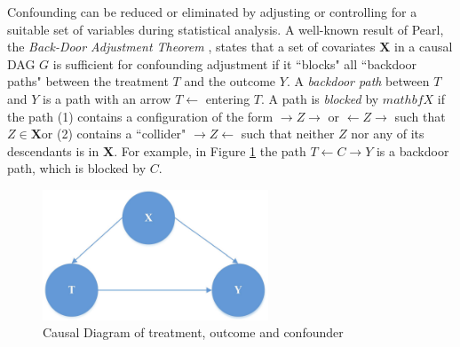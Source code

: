 Confounding can be reduced or eliminated by adjusting or controlling for a suitable set of variables during statistical analysis.  A well-known result of Pearl, the {\it Back-Door Adjustment Theorem} \cite{pearl2000models}, states that a set of covariates $\mathbf{X}$ in a causal DAG $G$ is sufficient for confounding adjustment if it ``blocks" all ``backdoor paths" between the treatment $T$ and the outcome $Y$.  A {\it backdoor path} between $T$ and $Y$ is a path with an arrow $T \leftarrow$ entering $T$.  A path is {\it blocked} by $mathbf{X}$ if the path (1) contains a configuration of the form $\rightarrow Z \rightarrow$ or $\leftarrow Z \rightarrow$ such that  $Z \in \mathbf{X}$or (2) contains a ``collider" $\rightarrow Z \leftarrow$  such that neither $Z$ nor any of its descendants is in $\mathbf{X}$.  For example, in Figure \ref{fig2.2} the path $T \leftarrow C \rightarrow Y$ is a backdoor path, which is blocked by $C$.

\begin{figure}[htb!]
\vspace{0em}
\begin{center}
\includegraphics[width=0.6\textwidth]{chapter2_CausalDAG1.pdf}
\vspace {0em}\caption{Causal Diagram of treatment, outcome and confounder} \label{fig2.2}
\end{center}
\vspace {0em}
\end{figure}

